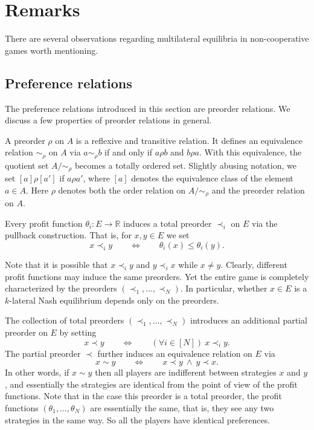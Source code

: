 \documentclass[a4paper,11pt,reqno,english]{amsart}
\theoremstyle{plain}
\theoremstyle{definition}
\begin{document}
\section{Remarks}

There are several observations regarding multilateral equilibria in non-cooperative games worth mentioning.

\subsection{Preference relations}
The preference relations introduced in this section are preorder relations. We discuss a few properties of preorder relations in general.

\medskip
A preorder $\rho$ on $A$ is a reflexive and transitive relation. It defines an equivalence relation $\sim_\rho$ on $A$ via $a\sim_\rho b$ if and only if $a\rho b$ and $b\rho a$. With this equivalence, the quotient set $A/\sim_{\rho}$ becomes a totally ordered set. Slightly abusing notation, we set $[a] \rho [a']$ if $a\rho a'$, where $[a]$ denotes the equivalence class of the element $a\in A$. Here $\rho$ denotes both the order relation on  $A/\sim_{\rho}$ and the preorder relation on $A$.


\medskip
Every profit function $\theta_i\colon E\longrightarrow\mathbb{R}$ induces a total preorder $\prec_i$ on $E$ via the pullback construction.
That is, for $x,y\in E$ we set
\begin{displaymath}
	x \prec_i y
	\qquad \Longleftrightarrow \qquad \theta_i(x) \leq \theta_i(y).
\end{displaymath}


\medskip
Note that it is possible that $x\prec_i y$ and $y\prec_i x$ while $x\neq y$.
Clearly, different profit functions may induce the same preorders.
Yet the entire game is completely characterized by the preorders $(\prec_1,\dots,\prec_N)$. In particular, whether $x\in E$ is a $k$-lateral Nash equilibrium depends only on the preorders.

\medskip
The collection of total preorders $(\prec_1,\dots,\prec_N)$ introduces an additional partial preorder on $E$ by setting
\begin{displaymath}
	x \prec y
	\qquad \Longleftrightarrow \qquad (\forall i\in[N])\ 	x \prec_i y.
\end{displaymath}
The partial preorder $\prec$ further induces an equivalence relation on $E$ via
\begin{displaymath}
	x \sim y \qquad \Longleftrightarrow \qquad   x \prec y \ \land \ y \prec x.
\end{displaymath}
In other words, if $x\sim y$ then all players are indifferent between strategies $x$ and $y$, and essentially the strategies are identical from the point of view of the profit functions.
Note that in the case this preorder is a total preorder, the profit functions $(\theta_1,\dots,\theta_N)$ are essentially the same, that is, they see any two strategies in the same way. So all the players have identical preferences.
\end{document}

